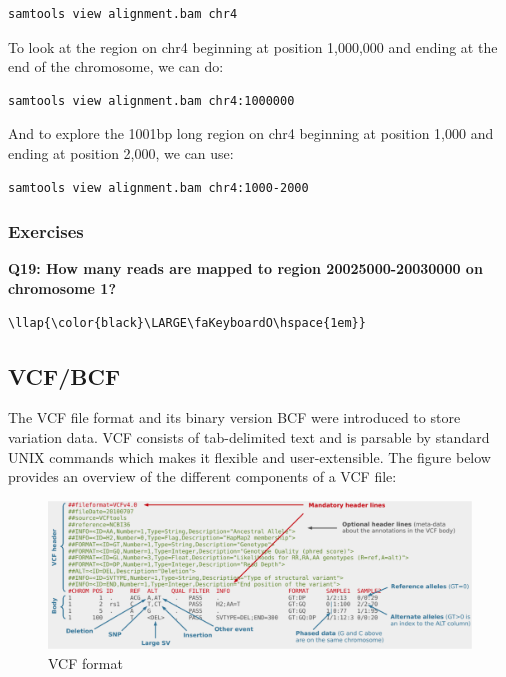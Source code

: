 \documentclass[11pt]{article}
\makeatletter
\def\maxwidth{\ifdim\Gin@nat@width>\linewidth\linewidth
    \else\Gin@nat@width\fi}
\let\Oldincludegraphics\includegraphics
\renewcommand{\includegraphics}[1]{\Oldincludegraphics[width=.8\maxwidth, height=.55\textheight, keepaspectratio]{#1}}
\makeatother
\begin{document}
\begin{verbatim}
samtools view alignment.bam chr4
\end{verbatim}

To look at the region on chr4 beginning at position 1,000,000 and ending
at the end of the chromosome, we can do:

\begin{verbatim}
samtools view alignment.bam chr4:1000000
\end{verbatim}

And to explore the 1001bp long region on chr4 beginning at position
1,000 and ending at position 2,000, we can use:

\begin{verbatim}
samtools view alignment.bam chr4:1000-2000
\end{verbatim}

    \hypertarget{exercises}{%
\subsubsection{Exercises}\label{exercises}}

\textbf{Q19: How many reads are mapped to region 20025000-20030000 on
chromosome 1?}

\begin{terminalinput}
\begin{Verbatim}[commandchars=\\\{\}]
\llap{\color{black}\LARGE\faKeyboardO\hspace{1em}}
\end{Verbatim}
\end{terminalinput}

    \hypertarget{vcfbcf}{%
\subsection{VCF/BCF}\label{vcfbcf}}

The VCF file format and its binary version BCF were introduced to store
variation data. VCF consists of tab-delimited text and is parsable by
standard UNIX commands which makes it flexible and user-extensible. The
figure below provides an overview of the different components of a VCF
file:

    \begin{figure}[H]
\centering
\includegraphics{img/VCF1.png}
\caption{VCF format}
\end{figure}
\end{document}
